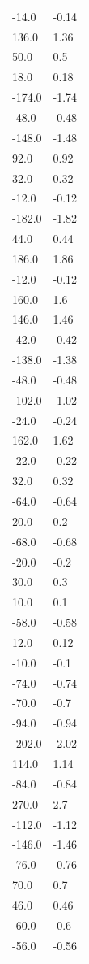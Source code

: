 \begin{longtable}{ll}
-14.0 & -0.14 \\
136.0 & 1.36 \\
50.0 & 0.5 \\
18.0 & 0.18 \\
-174.0 & -1.74 \\
-48.0 & -0.48 \\
-148.0 & -1.48 \\
92.0 & 0.92 \\
32.0 & 0.32 \\
-12.0 & -0.12 \\
-182.0 & -1.82 \\
44.0 & 0.44 \\
186.0 & 1.86 \\
-12.0 & -0.12 \\
160.0 & 1.6 \\
146.0 & 1.46 \\
-42.0 & -0.42 \\
-138.0 & -1.38 \\
-48.0 & -0.48 \\
-102.0 & -1.02 \\
-24.0 & -0.24 \\
162.0 & 1.62 \\
-22.0 & -0.22 \\
32.0 & 0.32 \\
-64.0 & -0.64 \\
20.0 & 0.2 \\
-68.0 & -0.68 \\
-20.0 & -0.2 \\
30.0 & 0.3 \\
10.0 & 0.1 \\
-58.0 & -0.58 \\
12.0 & 0.12 \\
-10.0 & -0.1 \\
-74.0 & -0.74 \\
-70.0 & -0.7 \\
-94.0 & -0.94 \\
-202.0 & -2.02 \\
114.0 & 1.14 \\
-84.0 & -0.84 \\
270.0 & 2.7 \\
-112.0 & -1.12 \\
-146.0 & -1.46 \\
-76.0 & -0.76 \\
70.0 & 0.7 \\
46.0 & 0.46 \\
-60.0 & -0.6 \\
-56.0 & -0.56 \\

\end{longtable}
